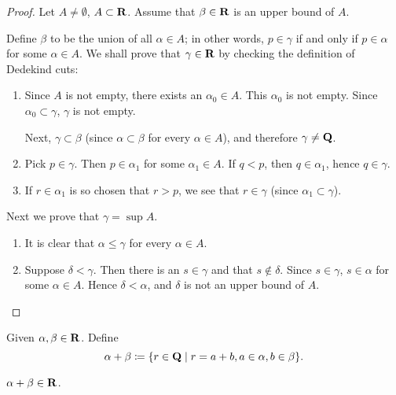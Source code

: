 \begin{proof}
Let $A\neq\emptyset$, $A\subset\mathbf R$. Assume that $\beta\in\mathbf R$ is an upper bound of $A$.

Define $\beta$ to be the union of all $\alpha\in A$; in other words, $p\in\gamma$ if and only if $p\in\alpha$ for some $\alpha\in A$. We shall prove that $\gamma\in\mathbf R$ by checking the definition of Dedekind cuts:
\begin{enumerate}[label=(\arabic*)]
\item Since $A$ is not empty, there exists an $\alpha_0\in A$. This $\alpha_0$ is not empty. Since $\alpha_0\subset\gamma$, $\gamma$ is not empty.

Next, $\gamma\subset\beta$ (since $\alpha\subset\beta$ for every $\alpha\in A$), and therefore $\gamma\neq\mathbf Q$.

\item Pick $p\in\gamma$. Then $p\in\alpha_1$ for some $\alpha_1\in A$. If $q<p$, then $q\in\alpha_1$, hence $q\in\gamma$.

\item If $r\in\alpha_1$ is so chosen that $r>p$, we see that $r\in\gamma$ (since $\alpha_1\subset\gamma$).
\end{enumerate}

Next we prove that $\gamma=\sup A$.
\begin{enumerate}[label=(\arabic*)]
\item It is clear that $\alpha\le\gamma$ for every $\alpha\in A$.
\item Suppose $\delta<\gamma$. Then there is an $s\in\gamma$ and that $s\notin\delta$. Since $s\in\gamma$, $s\in\alpha$ for some $\alpha\in A$. Hence $\delta<\alpha$, and $\delta$ is not an upper bound of $A$.
\end{enumerate}
\end{proof}

\begin{definition}
Given $\alpha,\beta\in\mathbf R$. Define 
\[\alpha+\beta\coloneqq\{r\in\mathbf Q\mid r=a+b,a\in\alpha,b\in\beta\}.\]
\end{definition}

\begin{proposition}
$\alpha+\beta\in\mathbf R$.
\end{proposition}

